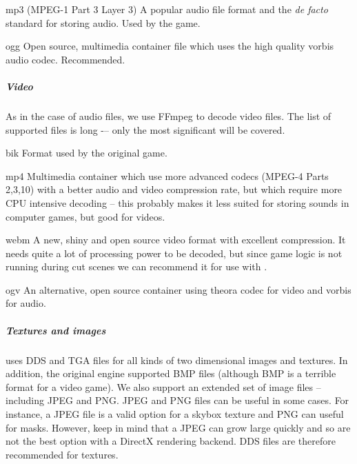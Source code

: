 \begin{description}
 \item mp3 ({MPEG}-1 {Part 3 Layer 3}) A popular audio file format and the \textit{de facto} standard for storing audio. Used by 
 the \MW{} game.
 \item ogg Open source, multimedia container file which uses the high quality vorbis audio codec. Recommended.
\end{description}

\subparagraph{Video}
As in the case of audio files, we use {FFmpeg} to decode video files. The list of supported files is long -– only the most 
significant will be covered.

\begin{description}
 \item bik Format used by the original \MW{} game.
 \item mp4 Multimedia container which use more advanced codecs ({MPEG-4 Parts 2,3,10}) with a better audio and video compression rate,
 but which require more {CPU} intensive decoding -- this probably makes it less suited for storing sounds in computer games, but
 good for videos.
 \item webm A new, shiny and open source video format with excellent compression. It needs quite a lot of processing power to be decoded,
 but since game logic is not running during cut scenes we can recommend it for use with \OMW.
 \item ogv An alternative, open source container using theora codec for video and vorbis for audio.
\end{description}

\subparagraph{Textures and images}
\MW{} uses {DDS} and {TGA} files for all kinds of two dimensional images and textures. In addition, the original engine supported BMP
files (although {BMP} is a terrible format for a video game). We also support an extended set of image files -- including {JPEG} and {PNG}.
JPEG and PNG files can be useful in some cases. For instance, a JPEG file is a valid option for a skybox texture and PNG can useful for masks.
However, keep in mind that a JPEG can grow large quickly and so are not the best option with a {DirectX} rendering backend. DDS files
are therefore recommended for textures. 
